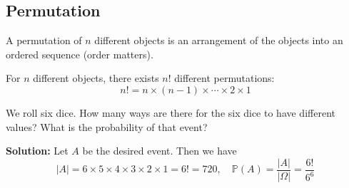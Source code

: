 \subsection{Permutation}

\begin{definition}[Permutation]
    A permutation of \(n\) different objects is an arrangement of the objects into an ordered sequence (order matters).
\end{definition}

\begin{proposition}
    For \(n\) different objects, there exists \(n!\) different permutations:
    \[
        n! = n \times (n-1) \times \cdots \times 2 \times 1
    \]
\end{proposition}

\begin{eg}
    We roll six dice. How many ways are there for the six dice to have different values? What is the probability of that event?
    
    \textbf{Solution:}
    Let \(A\) be the desired event. Then we have
    \[
        \vert A \vert = 6 \times 5 \times 4 \times 3 \times 2 \times 1 = 6! = 720, \quad \mathbb{P}(A) = \dfrac{\vert A \vert }{\vert \Omega \vert } = \dfrac{6!}{6^6}
    \]
\end{eg}

